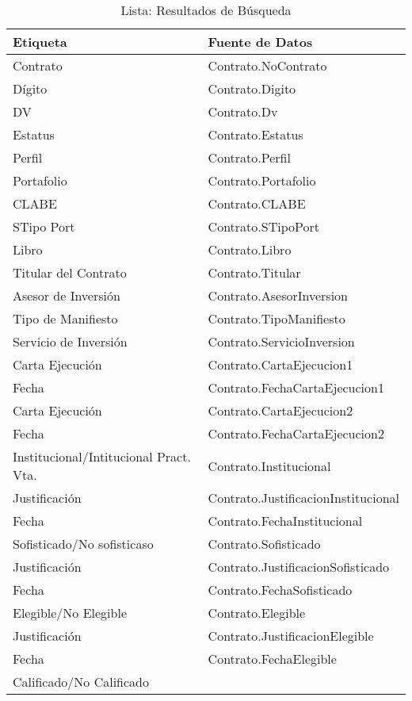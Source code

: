 \begin{table}[H]
	\caption{Lista: Resultados de B\'usqueda}
	\label{tab:ui-search-results-contrato-form}
	\begin{tabular}{ p{4cm} p{8cm} }
		\hline
		\textbf{Etiqueta} &
		\textbf{Fuente de Datos} \\
		\hline
		Contrato &
		Contrato.NoContrato \\
		D\'igito &
		Contrato.Digito \\
		DV &
		Contrato.Dv \\
		Estatus &
		Contrato.Estatus \\
		Perfil &
		Contrato.Perfil \\
		Portafolio &
		Contrato.Portafolio \\
		CLABE &
		Contrato.CLABE \\
		STipo Port &
		Contrato.STipoPort \\
		Libro &
		Contrato.Libro \\
		Titular del Contrato &
		Contrato.Titular \\
		Asesor de Inversi\'on &
		Contrato.AsesorInversion \\
		Tipo de Manifiesto &
		Contrato.TipoManifiesto \\
		Servicio de Inversi\'on &
		Contrato.ServicioInversion \\
		Carta Ejecuci\'on &
		Contrato.CartaEjecucion1 \\
		Fecha &
		Contrato.FechaCartaEjecucion1 \\
		Carta Ejecuci\'on &
		Contrato.CartaEjecucion2 \\
		Fecha &
		Contrato.FechaCartaEjecucion2 \\
		Institucional/Intitucional Pract. Vta. &
		Contrato.Institucional \\
		Justificaci\'on &
		Contrato.JustificacionInstitucional \\
		Fecha &
		Contrato.FechaInstitucional \\
		Sofisticado/No sofisticaso &
		Contrato.Sofisticado \\
		Justificaci\'on &
		Contrato.JustificacionSofisticado \\
		Fecha &
		Contrato.FechaSofisticado \\
		Elegible/No Elegible &
		Contrato.Elegible \\
		Justificaci\'on &
		Contrato.JustificacionElegible \\
		Fecha &
		Contrato.FechaElegible \\
		Calificado/No Calificado &

\end{tabular}
\end{table}
